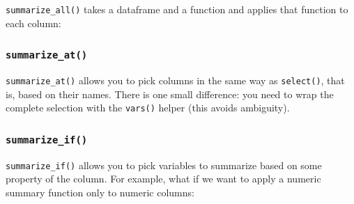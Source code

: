 \documentclass[]{book}
\newenvironment{Shaded}{\begin{snugshade}}{\end{snugshade}}
\newcommand{\KeywordTok}[1]{\textcolor[rgb]{0.13,0.29,0.53}{\textbf{#1}}}
\newcommand{\DataTypeTok}[1]{\textcolor[rgb]{0.13,0.29,0.53}{#1}}
\newcommand{\StringTok}[1]{\textcolor[rgb]{0.31,0.60,0.02}{#1}}
\newcommand{\CommentTok}[1]{\textcolor[rgb]{0.56,0.35,0.01}{\textit{#1}}}
\newcommand{\OperatorTok}[1]{\textcolor[rgb]{0.81,0.36,0.00}{\textbf{#1}}}
\newcommand{\NormalTok}[1]{#1}
\begin{document}
\texttt{summarize\_all()} takes a dataframe and a function and applies
that function to each column:

\begin{Shaded}
\end{Shaded}

\subsubsection*{\texorpdfstring{\texttt{summarize\_at()}}{summarize\_at()}}\label{summarize_at}

\texttt{summarize\_at()} allows you to pick columns in the same way as
\texttt{select()}, that is, based on their names. There is one small
difference: you need to wrap the complete selection with the
\texttt{vars()} helper (this avoids ambiguity).

\begin{Shaded}
\end{Shaded}

\subsubsection*{\texorpdfstring{\texttt{summarize\_if()}}{summarize\_if()}}\label{summarize_if}

\texttt{summarize\_if()} allows you to pick variables to summarize based
on some property of the column. For example, what if we want to apply a
numeric summary function only to numeric columns:

\begin{Shaded}
\end{Shaded}
\end{document}
